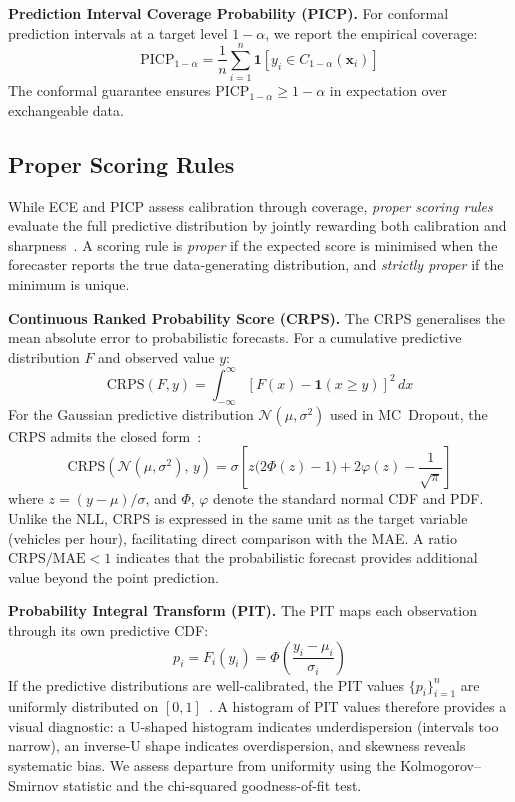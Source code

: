 \textbf{Prediction Interval Coverage Probability (PICP).} For conformal prediction intervals at a target level $1-\alpha$, we report the empirical coverage:
\begin{equation}
    \text{PICP}_{1-\alpha} = \frac{1}{n}\sum_{i=1}^{n} \mathbf{1}\!\left[y_i \in C_{1-\alpha}(\mathbf{x}_i)\right]
\end{equation}
The conformal guarantee ensures $\text{PICP}_{1-\alpha} \geq 1 - \alpha$ in expectation over exchangeable data.

\subsection{Proper Scoring Rules}\label{sec:proper_scoring_rules}

While ECE and PICP assess calibration through coverage, \emph{proper scoring rules} evaluate the full predictive distribution by jointly rewarding both calibration and sharpness~\cite{gneiting2007strictly}. A scoring rule is \emph{proper} if the expected score is minimised when the forecaster reports the true data-generating distribution, and \emph{strictly proper} if the minimum is unique.

\textbf{Continuous Ranked Probability Score (CRPS).} The CRPS generalises the mean absolute error to probabilistic forecasts. For a cumulative predictive distribution $F$ and observed value $y$:
\begin{equation}
    \text{CRPS}(F, y) = \int_{-\infty}^{\infty} \left[F(x) - \mathbf{1}(x \geq y)\right]^2 \, dx
\end{equation}
For the Gaussian predictive distribution $\mathcal{N}(\mu, \sigma^2)$ used in MC~Dropout, the CRPS admits the closed form~\cite{gneiting2007strictly}:
\begin{equation}\label{eq:crps_gaussian}
    \text{CRPS}\!\left(\mathcal{N}(\mu,\sigma^2),\, y\right) = \sigma\!\left[z\bigl(2\Phi(z)-1\bigr) + 2\varphi(z) - \frac{1}{\sqrt{\pi}}\right]
\end{equation}
where $z = (y - \mu)/\sigma$, and $\Phi$, $\varphi$ denote the standard normal CDF and PDF. Unlike the NLL, CRPS is expressed in the same unit as the target variable (vehicles per hour), facilitating direct comparison with the MAE. A ratio $\text{CRPS}/\text{MAE} < 1$ indicates that the probabilistic forecast provides additional value beyond the point prediction.

\textbf{Probability Integral Transform (PIT).} The PIT maps each observation through its own predictive CDF:
\begin{equation}
    p_i = F_i(y_i) = \Phi\!\left(\frac{y_i - \mu_i}{\sigma_i}\right)
\end{equation}
If the predictive distributions are well-calibrated, the PIT values $\{p_i\}_{i=1}^{n}$ are uniformly distributed on $[0,1]$~\cite{dawid1984present}. A histogram of PIT values therefore provides a visual diagnostic: a U-shaped histogram indicates underdispersion (intervals too narrow), an inverse-U shape indicates overdispersion, and skewness reveals systematic bias. We assess departure from uniformity using the Kolmogorov--Smirnov statistic and the chi-squared goodness-of-fit test.

